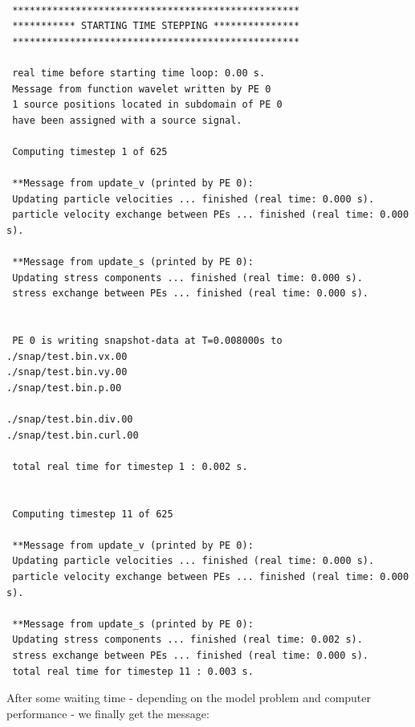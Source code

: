 \documentclass[11pt,onecolumn,oneside]{article}
\begin{document}
\begin{verbatim} 

 **************************************************
 *********** STARTING TIME STEPPING ***************
 **************************************************

 real time before starting time loop: 0.00 s.
 Message from function wavelet written by PE 0
 1 source positions located in subdomain of PE 0
 have been assigned with a source signal.

 Computing timestep 1 of 625

 **Message from update_v (printed by PE 0):
 Updating particle velocities ... finished (real time: 0.000 s).
 particle velocity exchange between PEs ... finished (real time: 0.000 s).

 **Message from update_s (printed by PE 0):
 Updating stress components ... finished (real time: 0.000 s).
 stress exchange between PEs ... finished (real time: 0.000 s).


 PE 0 is writing snapshot-data at T=0.008000s to
./snap/test.bin.vx.00
./snap/test.bin.vy.00
./snap/test.bin.p.00

./snap/test.bin.div.00
./snap/test.bin.curl.00

 total real time for timestep 1 : 0.002 s.


 Computing timestep 11 of 625

 **Message from update_v (printed by PE 0):
 Updating particle velocities ... finished (real time: 0.000 s).
 particle velocity exchange between PEs ... finished (real time: 0.000 s).

 **Message from update_s (printed by PE 0):
 Updating stress components ... finished (real time: 0.002 s).
 stress exchange between PEs ... finished (real time: 0.000 s).
 total real time for timestep 11 : 0.003 s.
\end{verbatim}

After some waiting time - depending on the model problem and computer performance - we finally get the message:
\end{document}
